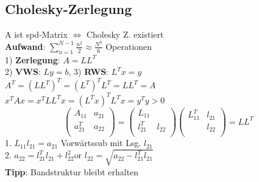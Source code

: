 \subsection{Cholesky-Zerlegung}
A ist spd-Matrix $\Leftrightarrow$ Cholesky Z. existiert\\
\textbf{Aufwand}: $\sum_{n=1}^{N-1}\frac{n^2}{2} \approx \frac{N^3}{6}$ Operationen\\
1) \textbf{Zerlegung}: $A = LL^T$\\
2) \textbf{VWS}: $Ly = b$, 
3) \textbf{RWS}: $L^Tx = y$\\
$A^T = (LL^T)^T = (L^T)^TL^T = LL^T = A$\\
\mbox{$x^TAx = x^TLL^Tx = (L^Tx)^TL^Tx = y^Ty > 0$}\\
\[\left(\begin{array}{cc}
A_{11} & a_{21} \\
a_{21}^T & a_{22} \\
\end{array}\right) =
\left(\begin{array}{cc}
L_{11} &  \\
l_{21}^T & l_{22} \\
\end{array}\right)
\left(\begin{array}{cc}
L_{11}^T & l_{21} \\
 & l_{22} \\
\end{array}\right)
= LL^T
\]
1. $L_{11}l_{21} = a_{21}$ Vorwärtssub mit Lsg. $l_{21}$\\
2. $a_{22} = l_{21}^Tl_{21}+l_{22}^2$or $l_{22} = \sqrt{a_{22}-l_{21}^Tl_{21}}$\\
\textbf{Tipp}: Bandstruktur bleibt erhalten
